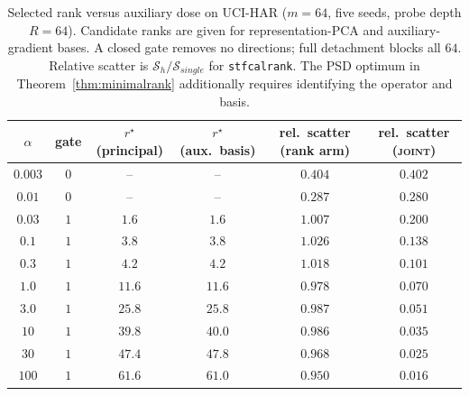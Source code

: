 \documentclass{article}
\begin{document}
\begin{table}[h]
\centering
\caption{Selected rank versus auxiliary dose on UCI-HAR ($m=64$, five seeds, probe depth $R=64$). Candidate ranks are given for representation-PCA and auxiliary-gradient bases. A closed gate removes no directions; full detachment blocks all $64$. Relative scatter is $\mathcal S_h/\mathcal S_{single}$ for \texttt{stfcalrank}. The PSD optimum in Theorem~\ref{thm:minimalrank} additionally requires identifying the operator and basis.}
\label{tab:doserank}
\footnotesize
\begin{tabular}{cccccc}
\toprule
$\alpha$ & gate & $r^\star$ (principal) & $r^\star$ (aux.\ basis) & rel.\ scatter (rank arm) & rel.\ scatter (\textsc{joint}) \\
\midrule
$0.003$ & $0$ & -- & -- & $0.404$ & $0.402$ \\
$0.01$  & $0$ & -- & -- & $0.287$ & $0.280$ \\
$0.03$  & $1$ & $1.6$ & $1.6$ & $1.007$ & $0.200$ \\
$0.1$   & $1$ & $3.8$ & $3.8$ & $1.026$ & $0.138$ \\
$0.3$   & $1$ & $4.2$ & $4.2$ & $1.018$ & $0.101$ \\
$1.0$   & $1$ & $11.6$ & $11.6$ & $0.978$ & $0.070$ \\
$3.0$   & $1$ & $25.8$ & $25.8$ & $0.987$ & $0.051$ \\
$10$    & $1$ & $39.8$ & $40.0$ & $0.986$ & $0.035$ \\
$30$    & $1$ & $47.4$ & $47.8$ & $0.968$ & $0.025$ \\
$100$   & $1$ & $61.6$ & $61.0$ & $0.950$ & $0.016$ \\
\bottomrule
\end{tabular}
\end{table}
\end{document}
